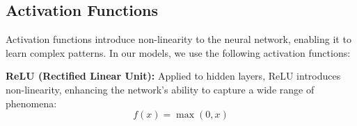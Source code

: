 \documentclass{article}
\begin{document}



\subsection{Activation Functions}
Activation functions introduce non-linearity to the neural network, enabling it to learn complex patterns. In our models, we use the following activation functions:

\textbf{ReLU (Rectified Linear Unit):} Applied to hidden layers, ReLU introduces non-linearity, enhancing the network's ability to capture a wide range of phenomena:
\begin{equation}
f(x) = \max(0, x)
\end{equation}
\end{document}
